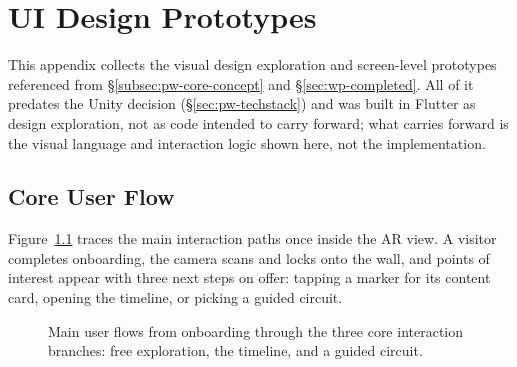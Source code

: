 \chapter{UI Design Prototypes}
\label{app:prototypes}

This appendix collects the visual design exploration and screen-level
prototypes referenced from \S\ref{subsec:pw-core-concept} and
\S\ref{sec:wp-completed}. All of it predates the Unity decision
(\S\ref{sec:pw-techstack}) and was built in Flutter as design exploration,
not as code intended to carry forward; what carries forward is
the visual language and interaction logic shown here, not the
implementation.

\section{Core User Flow}
\label{app:user-flow}

Figure~\ref{fig:user-flow} traces the main interaction paths once inside
the AR view. A visitor completes onboarding, the camera scans and locks
onto the wall, and points of interest appear with three next steps on
offer: tapping a marker for its content card, opening the timeline, or
picking a guided circuit.

\begin{figure}[H]
\centering
{}
\caption{Main user flows from onboarding through the three core interaction branches: free exploration, the timeline, and a guided circuit.}
\label{fig:user-flow}
\end{figure}

















